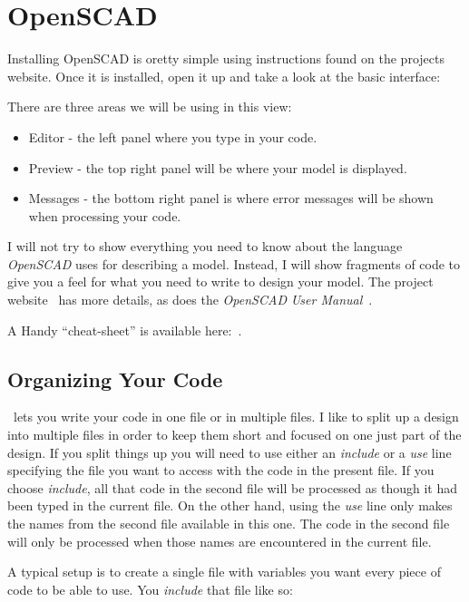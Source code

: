 \section*{OpenSCAD}

Installing OpenSCAD is oretty simple using instructions found on the projects
website. Once it is installed, open it up and take a look at the basic
interface:


There are three areas we will be using in this view:

\begin{itemize}
\item{Editor - the left panel where you type in your code.}
\item{Preview - the top right panel will be where your model is displayed.}
\item{Messages - the bottom right panel is where error messages will be shown
when processing your code.}
\end{itemize}

I will not try to show everything you need to know about the language {\it
OpenSCAD} uses for describing a model. Instead, I will show fragments of code
to give you a feel for what you need to write to design your model. The project
website~\cite{blackr} has more details, as does the {\it OpenSCAD} {\it User
Manual}~\cite{userman}.

A Handy ``cheat-sheet'' is available here:~\cite{osccheat}.

\subsection*{Organizing Your Code}

\osc\ lets you write your code in one file or in multiple files. I like to
split up a design into multiple files in order to keep them short and focused
on one just part of the design. If you split things up you will need to use either
an {\it include} or a {\it use} line specifying the file you want to access with
the code in the present file. If you choose {\it include}, all that code in the
second file will be processed as though it had been typed in the current file.
On the other hand, using the {\it use} line only makes the names from the
second file available in this one. The code in the second file will only be
processed when those names are encountered in the current file.

A typical setup is to create a single file with variables you want every piece
of code to be able to use. You {\it include} that file like so:

